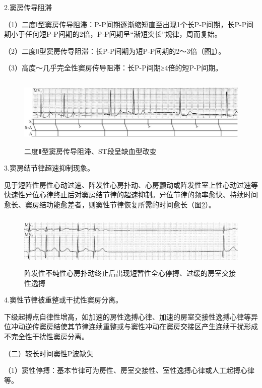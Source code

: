 2.窦房传导阻滞

（1）二度Ⅰ型窦房传导阻滞：P-P间期逐渐缩短直至出现1个长P-P间期，长P-P间期小于任何短P-P间期的2倍，P-P间期呈“渐短突长”规律，周而复始。

（2）二度Ⅱ型窦房传导阻滞：长P-P间期为短P-P间期的2～3倍（图\ref{fig1-16}）。

（3）高度～几乎完全性窦房传导阻滞：长P-P间期≥4倍的短P-P间期。

\begin{figure}[!htbp]
 \centering
 \includegraphics[width=5.78125in,height=1.32292in]{./images/Image00022.jpg}
 \captionsetup{justification=centering}
 \caption{二度Ⅱ型窦房传导阻滞、ST段呈缺血型改变}
 \label{fig1-16}
  \end{figure} 

3.窦房结节律超速抑制现象。

见于短阵性房性心动过速、阵发性心房扑动、心房颤动或阵发性室上性心动过速等快速性异位心律终止后对窦房结节律的超速抑制。异位节律的频率愈快、持续时间愈长、窦房结功能愈差者，则窦性节律恢复所需的时间愈长（图\ref{fig1-17}）。

\begin{figure}[!htbp]
 \centering
 \includegraphics[width=5.78125in,height=1.02083in]{./images/Image00023.jpg}
 \captionsetup{justification=centering}
 \caption{阵发性不纯性心房扑动终止后出现短暂性全心停搏、过缓的房室交接性逸搏}
 \label{fig1-17}
  \end{figure} 

4.窦性节律被重整或干扰性窦房分离。

下级起搏点自律性增高，如加速的房性逸搏心律、加速的房室交接性逸搏心律等异位冲动逆传窦房结使其节律连续重整或与窦性冲动在窦房交接区产生连续干扰形成不完全性干扰性窦房分离。

（二）较长时间窦性P波缺失

（1）窦性停搏：基本节律可为房性、房室交接性、室性逸搏心律或人工起搏心律等。

